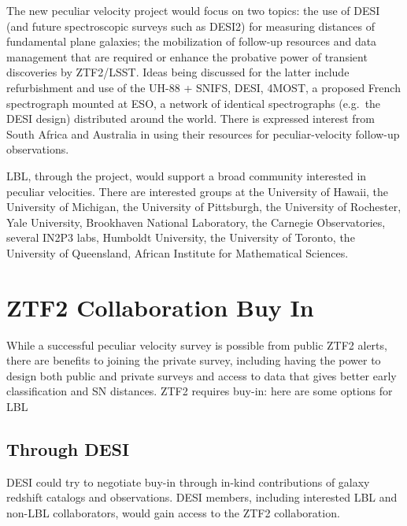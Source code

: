 \documentclass[11pt, oneside]{article}   	%
\begin{document}
The new peculiar velocity project would focus on two topics: the use of DESI (and future spectroscopic surveys
such as DESI2) for measuring distances of
fundamental plane galaxies; the mobilization of follow-up resources and data management that are required or enhance 
the probative power of transient discoveries by ZTF2/LSST.  Ideas being discussed for the latter include
refurbishment and use of the
UH-88 + SNIFS, DESI, 4MOST, a proposed French spectrograph mounted at ESO,
a network of identical spectrographs (e.g.\ the DESI design) distributed around the world.
There is expressed interest from South Africa and Australia in using their resources for peculiar-velocity follow-up observations.

LBL, through the project, would support a broad community interested in peculiar velocities. 
There are interested groups at the  University of Hawaii, the University of Michigan, the University of Pittsburgh, the University of Rochester, Yale University,  Brookhaven National Laboratory,
the Carnegie Observatories, several IN2P3 labs, Humboldt University, the University of Toronto,  the University of Queensland, African Institute for Mathematical
Sciences.

\section{ZTF2 Collaboration Buy In}

While a successful peculiar velocity survey is possible from public ZTF2 alerts,
there are benefits to joining the private survey, including having the power to design both public and private surveys and
access to data that gives better early classification and SN distances.
ZTF2 requires buy-in: here are some options for LBL

\subsection{Through DESI}

DESI could try to negotiate buy-in through in-kind contributions of galaxy redshift catalogs and observations.  DESI members, including interested
LBL and non-LBL collaborators, would gain access to the ZTF2 collaboration.
\end{document}
